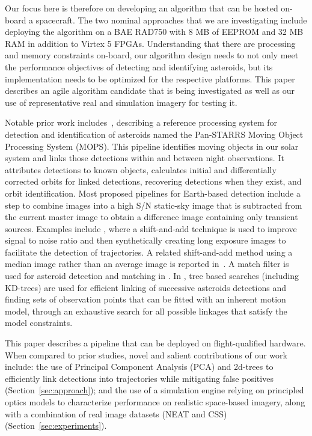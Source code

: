 \documentclass{article}
\begin{document}
Our focus here is therefore on developing an algorithm that can be hosted on-board a spacecraft. The two nominal approaches that we are investigating include deploying the algorithm on a BAE RAD750 with 8 MB of EEPROM and 32 MB RAM in addition to Virtex 5 FPGAs. Understanding that there are processing and memory constraints on-board, our algorithm design needs to not only meet the performance objectives of detecting and identifying asteroids, but its implementation needs to be optimized for the respective platforms. This paper describes an agile algorithm candidate that is being investigated as well as our use of representative real and simulation imagery for testing it.

Notable prior work includes~\cite{denneau2013pan}, describing a reference processing system for detection and identification of asteroids named the Pan-STARRS Moving Object Processing System (MOPS). This pipeline identifies moving objects in our solar system and links those detections within and between night observations. It attributes detections to known objects, calculates initial and differentially corrected orbits for linked detections, recovering detections when they exist, and orbit identification. Most proposed pipelines for Earth-based detection include a step to combine images into	 a high S/N static-sky image that is subtracted from the current master image to obtain a difference image containing only transient sources. Examples include \cite{shao2014finding}, where a shift-and-add technique is used to improve  signal to noise ratio and then synthetically creating long exposure images to facilitate the detection of trajectories. A related shift-and-add method using a median  image rather than an average image is reported in~\cite{yanagisawa2005automatic}. A match filter is used for asteroid detection and matching in \cite{gural2005matched}. In \cite{kubica2005variable,kubica2005multiple,kubica2007efficient}, tree based searches (including KD-trees) are used for efficient linking of successive asteroids detections and finding sets of observation points that can be fitted with an inherent motion model, through an exhaustive search for all possible linkages that satisfy the model constraints.
	
	This paper describes a %
	pipeline %
	that can be deployed on flight-qualified hardware. When compared to prior studies, novel and salient contributions of our work include: the use of Principal Component Analysis (PCA) and 2d-trees to efficiently  link detections into trajectories while mitigating false positives (Section~\ref{sec:approach}); and the use of a simulation engine relying on principled optics models to characterize performance on realistic space-based imagery, along with a combination of real image datasets (NEAT and CSS) (Section~\ref{sec:experiments}).
		
\end{document}
